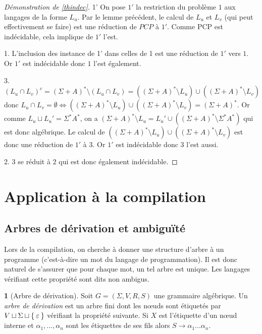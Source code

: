 \documentclass[11pt,a4paper]{article}
\theoremstyle{plain}
\theoremstyle{definition}
\newtheorem{defn}[thm]{\protect\definitionname}
\theoremstyle{definition}
\theoremstyle{remark}
\theoremstyle{remark}
\theoremstyle{plain}
\theoremstyle{plain}
\theoremstyle{plain}
\theoremstyle{remark}
\providecommand{\definitionname}{Définition}
\begin{document}
\begin{proof}[Démonstration de \ref{thindec}]
	\item[1'] On pose $1'$ la restriction du problème $1$ aux langages de la forme $L_u$. Par le lemme précédent, le calcul de $L_u$ et $L_v$ (qui peut effectivement se faire) est une réduction de $PCP$ à $1'$. Comme PCP est indécidable, cela implique de $1'$ l'est.
	
	\item[1.] L'inclusion des instance de 1' dans celles de 1 est une réduction de $1'$ vers $1$. Or $1'$ est indécidable donc $1$ l'est également.
	
	\item[3.] $(L_u\cap L_v)^c=(\Sigma+A)^*\setminus (L_u\cap L_v)=((\Sigma+A)^*\setminus L_u)\cup((\Sigma+A)^*\setminus  L_v)$ donc $L_u\cap L_v=\emptyset \iff ((\Sigma+A)^*\setminus L_u)\cup((\Sigma+A)^*\setminus  L_v)=(\Sigma+A)^*$. Or comme $L_u\sqcup L_u'=\Sigma^*A^*$, on a $(\Sigma+A)^*\setminus L_u=L_u'\cup ((\Sigma+A)^*\setminus \Sigma^*A^*)$ qui est donc algébrique. Le calcul de $((\Sigma+A)^*\setminus L_u)\cup((\Sigma+A)^*\setminus  L_v)$ est donc une réduction de $1'$ à $3$. Or $1'$ est indécidable donc $3$ l'est aussi.
	
	\item[2.] $3$ se réduit à $2$ qui est donc également indécidable.
\end{proof}

\section{Application à la compilation}

\subsection{Arbres de dérivation et ambiguïté} %

Lors de la compilation, on cherche à donner une structure d'arbre à un programme (c'est-à-dire un mot du langage de programmation). Il est donc naturel de s'assurer que pour chaque mot, un tel arbre est unique. Les langages vérifiant cette propriété sont dits non ambigus.

\begin{defn}[Arbre de dérivation]
	Soit $G=(\Sigma,V,R,S)$ une grammaire algébrique. Un \emph{arbre de dérivation} est un arbre fini dont les nœuds sont étiquetés par $V\sqcup \Sigma \sqcup \Set{\varepsilon}$ vérifiant la propriété suivante. Si $X$ est l'étiquette d'un nœud interne et $\alpha_1,\dots,\alpha_n$ sont les étiquettes de ses fils alors $S\to \alpha_1\dots\alpha_n$.
\end{defn}
\end{document}
